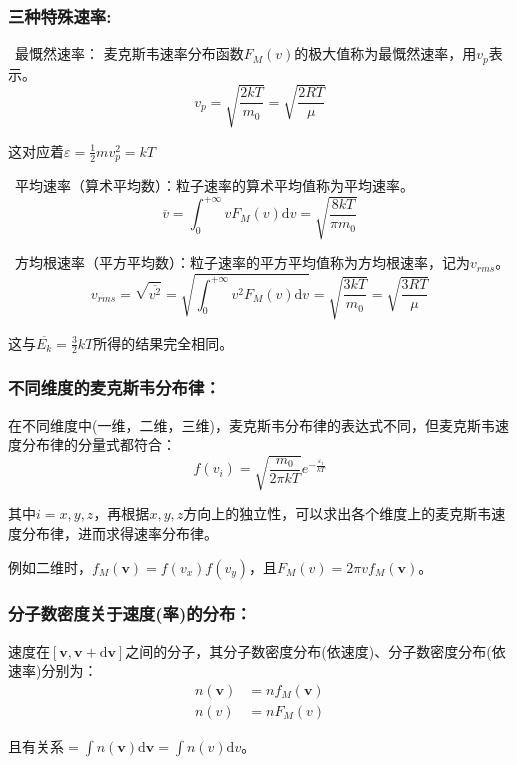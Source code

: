\documentclass[zihao=5,UTF8]{report}
\begin{document}
\subsubsection{三种特殊速率:}
\ 最慨然速率：
麦克斯韦速率分布函数$F_M(v)$的极大值称为最慨然速率，用$v_p$表示。
\begin{equation}
    v_p = \sqrt{\frac{2kT}{m_0}} = \sqrt{\frac{2RT}{\mu }}
\end{equation}\par
{\color{gray}\small 这对应着$\varepsilon = \frac{1}{2}mv_p^2 = kT$}\par
{}\ 平均速率（算术平均数）：粒子速率的算术平均值称为平均速率。
\begin{equation}
    \overline{v} = \int_{0}^{+\infty} vF_M(v)\mathrm{d}v = \sqrt{\frac{8kT}{\pi m_0}}
\end{equation}\par
{}\ 方均根速率（平方平均数）：粒子速率的平方平均值称为方均根速率，记为$v_{rms}$。
\begin{equation}
    v_{rms} = \sqrt{\overline{v^2}} =  \sqrt{\int_{0}^{+\infty} v^2F_M(v)\mathrm{d}v} = \sqrt{ \frac{3kT}{m_0}} = \sqrt{ \frac{3RT}{\mu }}
\end{equation}\par    
{\color{gray}\small 这与$\overline{E_k} = \frac{3}{2}kT$所得的结果完全相同。}
\subsubsection{不同维度的麦克斯韦分布律：}
在不同维度中(一维，二维，三维)，麦克斯韦分布律的表达式不同，但麦克斯韦速度分布律的分量式都符合：
\begin{equation}
    f(v_i) = \sqrt{\frac{m_0}{2\pi kT}}e^{-\frac{\varepsilon_{i}}{kT}}
\end{equation}\par
其中$i = x,y,z$，再根据$x,y,z$方向上的独立性，可以求出各个维度上的麦克斯韦速度分布律，进而求得速率分布律。\par
{\color{gray}\small 例如二维时，$f_M(\boldsymbol{v}) = f(v_x)f(v_y)$，且$F_M(v) = 2\pi vf_M(\boldsymbol{v})$。} 

\subsubsection{分子数密度关于速度(率)的分布：}
速度在$[\boldsymbol{v},\boldsymbol{v}+\mathrm{d}\boldsymbol{v}]$之间的分子，其分子数密度分布(依速度)、分子数密度分布(依速率)分别为：
\begin{align}
    n(\boldsymbol{v}) &= n f_M(\boldsymbol{v})\\
    n(v)& = n F_M(v)
\end{align}\par
且有关系$ = \int n(\boldsymbol{v})\mathrm{d}\boldsymbol{v} = \int n(v)\mathrm{d}v$。
\end{document}
